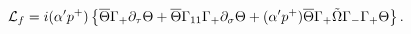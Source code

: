 \begin{equation}
{\cal L}_{f}=i(\alpha' p^{+})\left\{
\overline{\Theta}\Gamma_{+}\partial_{\tau}\Theta
+\overline{\Theta}\Gamma_{11}\Gamma_{+}\partial_{\sigma}\Theta
+(\alpha' p^{+})\overline{\Theta}\Gamma_{+}\tilde{\Omega}
\Gamma_{-}\Gamma_{+}\Theta\right\}.
\label{eq:LCfermi}
\end{equation}

